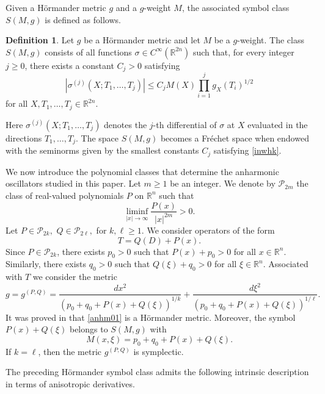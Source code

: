 \documentclass[12pt, reqno]{amsart}
\theoremstyle{definition}
\newtheorem{definition}[theorem]{Definition}
\theoremstyle{remark}
\numberwithin{equation}{section}
\begin{document}
Given a H\"ormander metric $g$ and a $g$-weight $M$, the associated symbol class $S(M,g)$ is defined as follows.

\begin{definition}
Let $g$ be a H\"ormander metric and let $M$ be a $g$-weight. The class $S(M,g)$ consists of all functions $\sigma\in C^\infty(\mathbb R^{2n})$ such that, for every integer $j\geq0$, there exists a constant $C_j>0$ satisfying
\begin{equation}
\label{inwhk}
    |\sigma^{(j)}(X;T_1,\ldots,T_j)|
    \leq
    C_j M(X)
    \prod_{i=1}^j g_X(T_i)^{1/2}
\end{equation}
for all $X,T_1,\ldots,T_j\in\mathbb R^{2n}$.

Here $\sigma^{(j)}(X;T_1,\ldots,T_j)$ denotes the $j$-th differential of $\sigma$ at $X$ evaluated in the directions $T_1,\ldots,T_j$. The space $S(M,g)$ becomes a Fr\'echet space when endowed with the seminorms given by the smallest constants $C_j$ satisfying \eqref{inwhk}.
\end{definition}

We now introduce the polynomial classes that determine the anharmonic oscillators studied in this paper. Let $m\geq1$ be an integer. We denote by $\mathcal P_{2m}$ the class of real-valued polynomials $P$ on $\mathbb R^n$ such that
\[
    \liminf_{|x|\to\infty}\frac{P(x)}{|x|^{2m}}>0 .
\]
Let $P\in\mathcal P_{2k},
    \,\,
    Q\in\mathcal P_{2\ell},$ for $
    k,\ell\geq1.$
We consider operators of the form
\begin{equation}
\label{qpop5}
    T=Q(D)+P(x).
\end{equation}
Since $P\in\mathcal P_{2k}$, there exists $p_0>0$ such that $P(x)+p_0>0$ for all $x\in\mathbb R^n$. Similarly, there exists $q_0>0$ such that $Q(\xi)+q_0>0$ for all $\xi\in\mathbb R^n$. Associated with $T$ we consider the metric
\begin{equation}
\label{anhm01}
    g=g^{(P,Q)}
    =
    \frac{dx^2}
    {(p_0+q_0+P(x)+Q(\xi))^{1/k}}
    +
    \frac{d\xi^2}
    {(p_0+q_0+P(x)+Q(\xi))^{1/\ell}} .
\end{equation}
It was proved in \cite{anh:cdr, anh:cdr2} that \eqref{anhm01} is a H\"ormander metric. Moreover, the symbol $P(x)+Q(\xi)$ belongs to $S(M,g)$ with
\[
    M(x,\xi)=p_0+q_0+P(x)+Q(\xi).
\]
If $k=\ell$, then the metric $g^{(P,Q)}$ is symplectic.

The preceding H\"ormander symbol class admits the following intrinsic description in terms of anisotropic derivatives.
\end{document}

